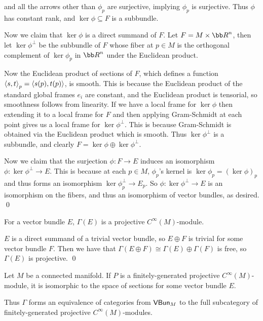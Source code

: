     and all the arrows other than $\phi_p$ are surjective, implying $\phi_p$ is surjective.
    Thus $\phi$ has constant rank, and $\ker\phi\subseteq F$ is a subbundle.

    Now we claim that $\ker\phi$ is a direct summand of $F$.
    Let $F=M\times\bR^n$, then let $\ker\phi^\perp$ be the subbundle of $F$ whose fiber at $p\in M$ is the orthogonal complement of $\ker\phi_p$ in $\bR^n$
    under the Euclidean product.

    Now the Euclidean product of sections of $F$, which defines a function $\mathopen{}\mathclose{\left<s,t\right>}_p=\mathopen{}\mathclose{\left<s(p),t(p)\right>}$, is smooth.
    This is because the Euclidean product of the standard global frames $e_i$ are constant, and the Euclidean product is tensorial, so smoothness follows from linearity.
    If we have a local frame for $\ker\phi$ then extending it to a local frame for $F$ and then applying Gram-Schmidt at each point gives us a local frame for $\ker\phi^\perp$.
    This is because Gram-Schmidt is obtained via the Euclidean product which is smooth.
    Thus $\ker\phi^\perp$ is a subbundle, and clearly $F=\ker\phi\oplus\ker\phi^\perp$.

    Now we claim that the surjection $\phi\colon F\to E$ induces an isomorphism $\phi\colon\ker\phi^\perp\to E$.
    This is because at each $p\in M$, $\phi_p$'s kernel is $\ker\phi_p=(\ker\phi)_p$ and thus forms an isomorphism $\ker\phi^\perp_p\to E_p$.
    So $\phi\colon\ker\phi^\perp\to E$ is an isomorphism on the fibers, and thus an isomorphism of vector bundles, as desired.
    \qed

\eproof

\bcoro

    For a vector bundle $E$, $\Gamma(E)$ is a projective $C^\infty(M)$-module.

\ecoro

\bproof

    $E$ is a direct summand of a trivial vector bundle, so $E\oplus F$ is trivial for some vector bundle $F$.
    Then we have that $\Gamma(E\oplus F)\cong\Gamma(E)\oplus\Gamma(F)$ is free, so $\Gamma(E)$ is projective.
    \qed

\eproof

\bthrm[title=Serre-Swan]

    Let $M$ be a connected manifold.
    If $P$ is a finitely-generated projective $C^\infty(M)$-module, it is isomorphic to the space of sections for some vector bundle $E$.

    Thus $\Gamma$ forms an equivalence of categories from ${\sf VBun}_M$ to the full subcategory of finitely-generated projective $C^\infty(M)$-modules.

